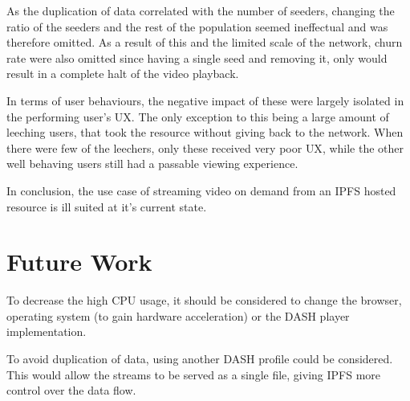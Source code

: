 As the duplication of data correlated with the number of seeders, changing the ratio of the seeders and the rest of the population seemed ineffectual and was therefore omitted. As a result of this and the limited scale of the network, churn rate were also omitted since having a single seed and removing it, only would result in a complete halt of the video playback.

In terms of user behaviours, the negative impact of these were largely isolated in the performing user's \ac{UX}. The only exception to this being a large amount of leeching users, that took the resource without giving back to the network. When there were few of the leechers, only these received very poor \ac{UX}, while the other well behaving users still had a passable viewing experience.

In conclusion, the use case of streaming video on demand from an \ac{IPFS} hosted resource is ill suited at it's current state.

\section{Future Work}
To decrease the high \ac{CPU} usage, it should be considered to change the browser, operating system (to gain hardware acceleration) or the \ac{DASH} player implementation.

To avoid duplication of data, using another \ac{DASH} profile could be considered. This would allow the streams to be served as a single file, giving \ac{IPFS} more control over the data flow.


